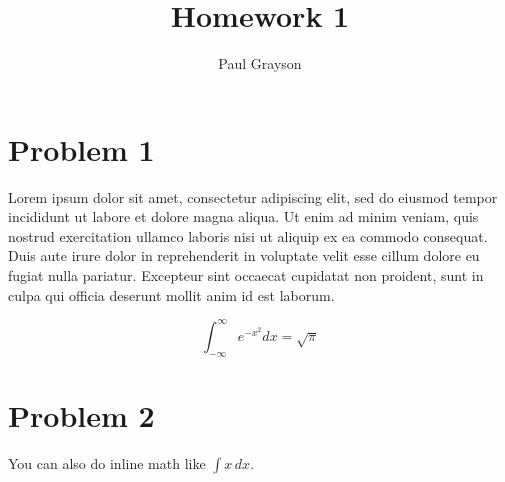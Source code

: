 \documentclass[12pt]{article}
\begin{document}
\title{Homework 1}
\author{Paul Grayson}
\maketitle

\section*{Problem 1}

Lorem ipsum dolor sit amet, consectetur adipiscing elit, sed do eiusmod tempor incididunt ut labore et dolore magna aliqua. Ut enim ad minim veniam, quis nostrud exercitation ullamco laboris nisi ut aliquip ex ea commodo consequat. Duis aute irure dolor in reprehenderit in voluptate velit esse cillum dolore eu fugiat nulla pariatur. Excepteur sint occaecat cupidatat non proident, sunt in culpa qui officia deserunt mollit anim id est laborum.

$$\int_{-\infty}^\infty e^{-x^2} dx = \sqrt{\pi}$$

\section*{Problem 2}

You can also do inline math like $\int x\,dx$.
\end{document}
